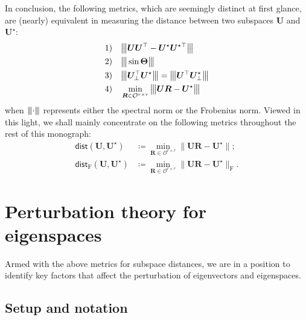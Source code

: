In conclusion, the following metrics, which are seemingly distinct at first glance,  are (nearly) equivalent in measuring the distance between two subspaces $\bm{U}$ and $\bm{U}^{\star}$:
%
\begin{align}
	\mathrm{1)} \quad & \vertiiibig{\bm{U}\bm{U}^{\top} - \bm{U}^{\star}\bm{U}^{\star\top}}  \notag\\
	\mathrm{2)} \quad & \vertiiibig{\sin\bm{\Theta}}  \notag\\
	\mathrm{3)} \quad & \vertiiibig{ \bm{U}_{\perp}^{\top}\bm{U}^{\star} }=\vertiiibig{ \bm{U}^{\top}\bm{U}^{\star}_{\perp} }  \notag \\
	\mathrm{4)} \quad & \min_{\bm{R}\in \mathcal{O}^{r\times r}} \vertiiibig{ \bm{U}\bm{R} - \bm{U}^{\star} } \notag
\end{align}
%
when ${\left\vert\kern-0.25ex\left\vert\kern-0.25ex\left\vert \cdot \right\vert\kern-0.25ex\right\vert\kern-0.25ex\right\vert}$ represents either the spectral norm  or the Frobenius norm.
Viewed in this light, we shall mainly concentrate on the following metrics throughout the rest of this monograph:
%
\begin{subequations}
\label{eq:dist_UUstar}
\begin{align}
	\mathsf{dist}(\bm{U},\bm{U}^{\star}) &\coloneqq \min_{\bm{R}\in \mathcal{O}^{r\times r}} \big\| \bm{U}\bm{R} - \bm{U}^{\star} \big\|;
	\label{eq:dist_UUstar-spectral} \\
	\mathsf{dist}_{\mathrm{F}}(\bm{U},\bm{U}^{\star}) &\coloneqq  \min_{\bm{R}\in \mathcal{O}^{r\times r}} \big\| \bm{U}\bm{R} - \bm{U}^{\star} \big\|_{\mathrm{F}}.
	\label{eq:dist_UUstar-fro}
\end{align}
\end{subequations}
%



\section{Perturbation theory for eigenspaces}
\label{sec:perturbation}

Armed with the above metrics for subspace distances, we are in a position to identify key factors that affect the perturbation of eigenvectors and eigenspaces.


\subsection{Setup and notation}
\label{sec:setting-davis-kahan}


